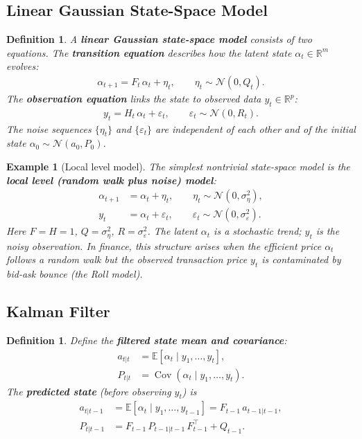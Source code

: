 \documentclass{report}
\theoremstyle{spacedplain}
\theoremstyle{spaceddefinition}
\newtheorem{definition}[theorem]{Definition}
\newtheorem{example}[theorem]{Example}
\theoremstyle{spacedremark}
\begin{document}
\subsection{Linear Gaussian State-Space Model}
 
\begin{definition}
A \textbf{linear Gaussian state-space model} consists of two equations. The \textbf{transition equation} describes how the latent state $\alpha_t \in \mathbb{R}^m$ evolves:
\begin{align}
    \alpha_{t+1} = F_t\,\alpha_t + \eta_t, \qquad \eta_t \sim \mathcal{N}(0, Q_t).
\end{align}
The \textbf{observation equation} links the state to observed data $y_t \in \mathbb{R}^p$:
\begin{align}
    y_t = H_t\,\alpha_t + \varepsilon_t, \qquad \varepsilon_t \sim \mathcal{N}(0, R_t).
\end{align}
The noise sequences $\{\eta_t\}$ and $\{\varepsilon_t\}$ are independent of each other and of the initial state $\alpha_0 \sim \mathcal{N}(a_0, P_0)$.
\end{definition}
 
\begin{example}[Local level model]
The simplest nontrivial state-space model is the \textbf{local level (random walk plus noise) model}:
\begin{align}
    \alpha_{t+1} &= \alpha_t + \eta_t, \qquad \eta_t \sim \mathcal{N}(0, \sigma_\eta^2), \\
    y_t &= \alpha_t + \varepsilon_t, \qquad \varepsilon_t \sim \mathcal{N}(0, \sigma_\varepsilon^2).
\end{align}
Here $F = H = 1$, $Q = \sigma_\eta^2$, $R = \sigma_\varepsilon^2$. The latent $\alpha_t$ is a stochastic trend; $y_t$ is the noisy observation. In finance, this structure arises when the efficient price $\alpha_t$ follows a random walk but the observed transaction price $y_t$ is contaminated by bid-ask bounce (the Roll model).
\end{example}
 
\subsection{Kalman Filter}
 
\begin{definition}
Define the \textbf{filtered state mean and covariance}:
\begin{align}
    a_{t|t} &= \mathbb{E}[\alpha_t \mid y_1, \ldots, y_t], \\
    P_{t|t} &= \operatorname{Cov}(\alpha_t \mid y_1, \ldots, y_t).
\end{align}
The \textbf{predicted state} (before observing $y_t$) is
\begin{align}
    a_{t|t-1} &= \mathbb{E}[\alpha_t \mid y_1,\ldots,y_{t-1}] = F_{t-1}\,a_{t-1|t-1}, \\
    P_{t|t-1} &= F_{t-1}\,P_{t-1|t-1}\,F_{t-1}^\top + Q_{t-1}.
\end{align}
\end{definition}
 
\end{document}

